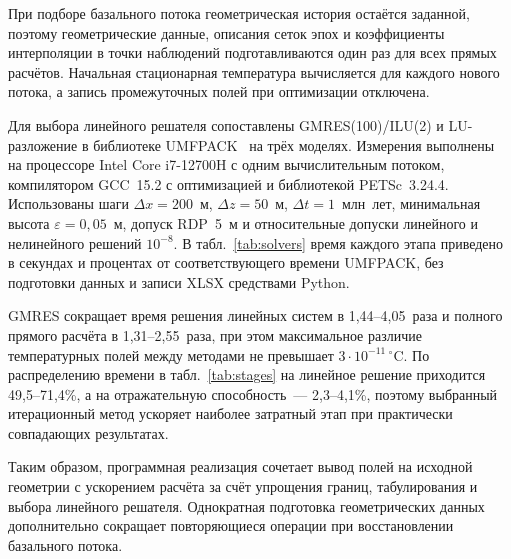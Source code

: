 При подборе базального потока геометрическая история остаётся заданной, поэтому геометрические данные, описания сеток эпох и коэффициенты интерполяции в точки наблюдений подготавливаются один раз для всех прямых расчётов. Начальная стационарная температура вычисляется для каждого нового потока, а запись промежуточных полей при оптимизации отключена.

Для выбора линейного решателя сопоставлены GMRES(100)/ILU(2) и LU-разложение в библиотеке UMFPACK~\cite{umfpack2004} на трёх моделях. Измерения выполнены на процессоре Intel Core i7-12700H с одним вычислительным потоком, компилятором GCC~15.2 с оптимизацией и библиотекой PETSc~3.24.4. Использованы шаги $\Delta x=200$~м, $\Delta z=50$~м, $\Delta t=1$~млн~лет, минимальная высота $\varepsilon=0{,}05$~м, допуск RDP~5~м и относительные допуски линейного и нелинейного решений $10^{-8}$. В табл.~\ref{tab:solvers} время каждого этапа приведено в секундах и процентах от соответствующего времени UMFPACK, без подготовки данных и записи XLSX средствами Python.

GMRES сокращает время решения линейных систем в 1,44--4,05~раза и полного прямого расчёта в 1,31--2,55~раза, при этом максимальное различие температурных полей между методами не превышает $3\cdot10^{-11}\,{}^\circ$C. По распределению времени в табл.~\ref{tab:stages} на линейное решение приходится 49,5--71,4\%, а на отражательную способность~--- 2,3--4,1\%, поэтому выбранный итерационный метод ускоряет наиболее затратный этап при практически совпадающих результатах.




Таким образом, программная реализация сочетает вывод полей на исходной геометрии с ускорением расчёта за счёт упрощения границ, табулирования и выбора линейного решателя. Однократная подготовка геометрических данных дополнительно сокращает повторяющиеся операции при восстановлении базального потока.
